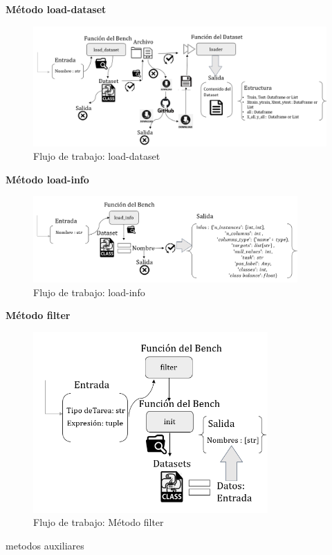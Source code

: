 \begin{flushleft} 
    { \textbf{Método load-dataset }}\label{section:load_d}
\end{flushleft}

 \begin{figure}[H]
    \centering
    \includegraphics[width=1 \textwidth]{Graphics/methods/load-dataset.png}
    \caption{Flujo de trabajo: load-dataset}
    \label{fig:image5}
 \end{figure}

\begin{flushleft} 
    { \textbf{Método load-info }}\label{section:load_i}
\end{flushleft}

 \begin{figure}[H]
    \centering
    \includegraphics[width= 0.9\textwidth]{Graphics/methods/load_info.png}
    \caption{Flujo de trabajo: load-info}
    \label{fig:image6}
 \end{figure}

\begin{flushleft} 
    { \textbf{Método filter }}\label{section:filter}
\end{flushleft}

 \begin{figure}[H]
    \centering
    \includegraphics[width=0.8\textwidth]{Graphics/methods/filter.png}
    \caption{Flujo de trabajo: Método filter}
    \label{fig:image7}
 \end{figure}


metodos auxiliares










